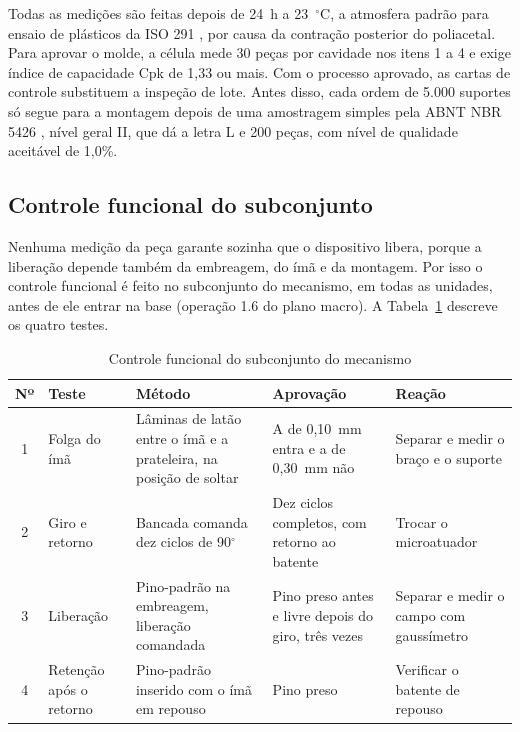 Todas as medições são feitas depois de 24~h a 23~$^\circ$C, a atmosfera padrão para ensaio de plásticos da ISO 291 \cite{iso291}, por causa da contração posterior do poliacetal. Para aprovar o molde, a célula mede 30 peças por cavidade nos itens 1 a 4 e exige índice de capacidade Cpk de 1,33 ou mais. Com o processo aprovado, as cartas de controle substituem a inspeção de lote. Antes disso, cada ordem de 5.000 suportes só segue para a montagem depois de uma amostragem simples pela ABNT NBR 5426 \cite{abnt5426}, nível geral II, que dá a letra L e 200 peças, com nível de qualidade aceitável de 1,0\%.

\subsection{Controle funcional do subconjunto}
\label{subsec:ctrl_funcional}

Nenhuma medição da peça garante sozinha que o dispositivo libera, porque a liberação depende também da embreagem, do ímã e da montagem. Por isso o controle funcional é feito no subconjunto do mecanismo, em todas as unidades, antes de ele entrar na base (operação 1.6 do plano macro). A Tabela~\ref{tab:ctrl_funcional} descreve os quatro testes.

\begin{table}[htbp]
    \centering
    \caption{Controle funcional do subconjunto do mecanismo}
    \label{tab:ctrl_funcional}
    \footnotesize
    \renewcommand{\arraystretch}{1.3}
    \begin{tabularx}{\textwidth}{@{}
        c
        >{\RaggedRight\arraybackslash}p{2.4cm}
        >{\RaggedRight\arraybackslash}X
        >{\RaggedRight\arraybackslash}p{3.8cm}
        >{\RaggedRight\arraybackslash}p{3.0cm}@{}}
        \toprule
        \textbf{Nº} & \textbf{Teste} & \textbf{Método} & \textbf{Aprovação} & \textbf{Reação} \\
        \midrule
        1 & Folga do ímã & Lâminas de latão entre o ímã e a prateleira, na posição de soltar & A de 0,10~mm entra e a de 0,30~mm não & Separar e medir o braço e o suporte \\
        2 & Giro e retorno & Bancada comanda dez ciclos de 90$^\circ$ & Dez ciclos completos, com retorno ao batente & Trocar o microatuador \\
        3 & Liberação & Pino-padrão na embreagem, liberação comandada & Pino preso antes e livre depois do giro, três vezes & Separar e medir o campo com gaussímetro \\
        4 & Retenção após o retorno & Pino-padrão inserido com o ímã em repouso & Pino preso & Verificar o batente de repouso \\
        \bottomrule
    \end{tabularx}
\end{table}

